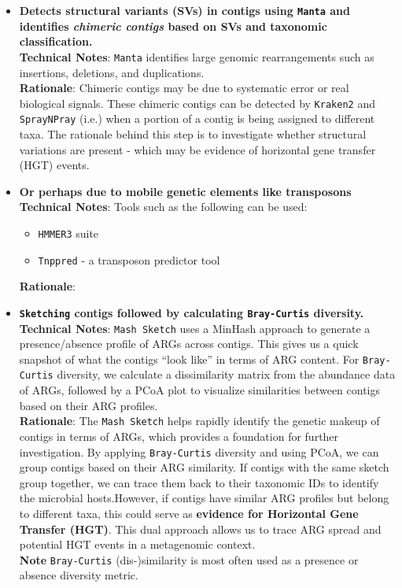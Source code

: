 \documentclass[11pt]{report}
\begin{document}
\begin{itemize}
	\item \textbf{Detects structural variants (SVs) in contigs using \texttt{Manta} and identifies \textit{chimeric contigs} based on SVs and taxonomic classification.}\\
	\textbf{Technical Notes}: \texttt{Manta} identifies large genomic rearrangements such as insertions, deletions, and duplications. \\
	\textbf{Rationale}: Chimeric contigs may be due to systematic error or real biological signals. These chimeric contigs can be detected by \texttt{Kraken2} and \texttt{SprayNPray} (i.e.) when a portion of a contig is being assigned to different taxa. The rationale behind this step is to investigate whether structural variations are present - which may be evidence of horizontal gene transfer (HGT) events. 
	
	\item \textbf{Or perhaps due to mobile genetic elements like transposons}\\
	\textbf{Technical Notes}: Tools such as the following can be used:
	\begin{itemize}
		\item \texttt{HMMER3} suite
		\item \texttt{Tnppred} - a transposon predictor tool
		
	\end{itemize}
	
	\textbf{Rationale}: 
	
	
	
	\item \textbf{\texttt{Sketching} contigs followed by calculating \texttt{Bray-Curtis} diversity.}\\
	\textbf{Technical Notes}: \texttt{Mash Sketch} uses a MinHash approach to generate a presence/absence profile of ARGs across contigs. This gives us a quick snapshot of what the contigs “look like” in terms of ARG content. For \texttt{Bray-Curtis} diversity, we calculate a dissimilarity matrix from the abundance data of ARGs, followed by a PCoA plot to visualize similarities between contigs based on their ARG profiles. \\
	\textbf{Rationale}: The \texttt{Mash Sketch} helps rapidly identify the genetic makeup of contigs in terms of ARGs, which provides a foundation for further investigation. By applying \texttt{Bray-Curtis} diversity and using PCoA, we can group contigs based on their ARG similarity. If contigs with the same sketch group together, we can trace them back to their taxonomic IDs to identify the microbial hosts.However, if contigs have similar ARG profiles but belong to different taxa, this could serve as \textbf{evidence for \textbf{Horizontal Gene Transfer (HGT)}}. This dual approach allows us to trace ARG spread and potential HGT events in a metagenomic context. \\
	\textbf{Note} \texttt{Bray-Curtis} (dis-)similarity is most often used as a presence or absence diversity metric.
	


\end{itemize}
\end{document}

